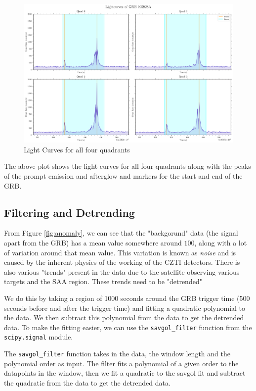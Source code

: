 \documentclass[11pt]{book} %
\begin{document}
\begin{figure}[H]
    \centering
    \includegraphics[scale=0.35]{Pictures/allquads.png}
    \caption{Light Curves for all four quadrants}
\end{figure}

The above plot shows the light curves for all four quadrants along with the peaks of the prompt emission and afterglow and markers for the start and end of the GRB.

\subsection{Filtering and Detrending}
%
%
%
%
From Figure \ref{fig:anomaly}, we can see that the "backgorund" data (the signal apart from the GRB) has a mean value somewhere around $100$, along with a lot of variation around that mean value. This variation is known as \textit{noise} and is caused by the inherent physics of the working of the CZTI detectors. There is also various "trends" present in the data due to the satellite observing various targets and the SAA region. These trends need to be "detrended"

We do this by taking a region of 1000 seconds around the GRB trigger time (500 seconds before and after the trigger time) and fitting a quadratic polynomial to the data. We then subtract this polynomial from the data to get the detrended data. To make the fitting easier, we can use the \lstinline[language=Python]{savgol_filter} function from the \lstinline[language=Python]{scipy.signal} module. 

The \lstinline[language=Python]{savgol_filter} function takes in the data, the window length and the polynomial order as input. The filter fits a polynomial of a given order to the datapoints in the window, then we fit a quadratic to the savgol fit and subtract the quadratic from the data to get the detrended data.
\end{document}
